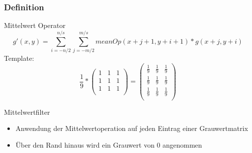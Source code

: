 \documentclass[aspectratio=169]{beamer}
\begin{document}
\begin{frame}
    \frametitle{Definition}
    \begin{center}
    \begin{alertblock}
        {Mittelwert Operator}
        \begin{equation}
            g'(x,y)=\sum_{i=-n/2}^{n/s}\sum_{j=-m/2}^{m/s}meanOp(x+j+1,y+i+1)*g(x+j,y+i)
        \end{equation}
        Template:
        \begin{equation}
            \frac{1}{9} *
            \begin{pmatrix}
                1 & 1 & 1 \\
                1 & 1 & 1 \\
                1 & 1 & 1 \\
            \end{pmatrix}
            =
            \begin{pmatrix}
                \frac{1}{9} & \frac{1}{9} & \frac{1}{9} \\
                \frac{1}{9} & \frac{1}{9} & \frac{1}{9} \\
                \frac{1}{9} & \frac{1}{9} & \frac{1}{9} \\
            \end{pmatrix}
        \end{equation}
    \end{alertblock}
    \begin{alertblock}
        {Mittelwertfilter}
        \begin{itemize}
            \item Anwendung der Mittelwertoperation auf jeden Eintrag einer Grauwertmatrix
            \item Über den Rand hinaus wird ein Grauwert von 0 angenommen
        \end{itemize}
    \end{alertblock}
    \end{center}
\end{frame}
\end{document}
